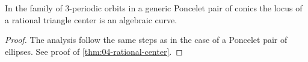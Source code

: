  \begin{theorem}\label{thm:loci_algebraic_general}
 In the family of 3-periodic orbits in a generic Poncelet pair of conics the locus of a rational triangle center is an algebraic curve. 
 \end{theorem}

 \begin{proof}
 The analysis follow the same steps as in the case of a Poncelet pair of ellipses.  See proof of \cref{thm:04-rational-center}. 
\end{proof}